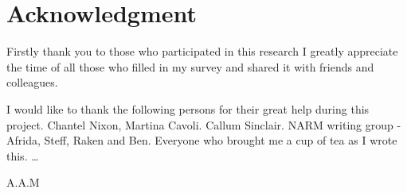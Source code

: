\section*{Acknowledgment}
Firstly thank you to those who participated in this research I greatly appreciate the time of all those who filled in my survey and shared it with friends and colleagues.

I would like to thank the following persons for their great help during this project. Chantel Nixon, Martina Cavoli. Callum Sinclair. NARM writing group - Afrida, Steff, Raken and Ben. Everyone who brought me a cup of tea as I wrote this. \ldots



\begin{flushright}
A.A.M\\[1pc]

\end{flushright}